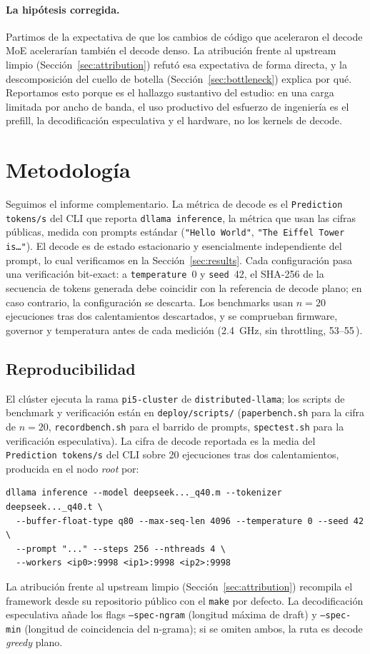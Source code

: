 \documentclass[10pt,a4paper]{article}
\begin{document}
\paragraph{La hipótesis corregida.} Partimos de la expectativa de que los cambios de código que aceleraron el decode MoE acelerarían también el decode denso. La atribución frente al upstream limpio (Sección~\ref{sec:attribution}) refutó esa expectativa de forma directa, y la descomposición del cuello de botella (Sección~\ref{sec:bottleneck}) explica por qué. Reportamos esto porque es el hallazgo sustantivo del estudio: en una carga limitada por ancho de banda, el uso productivo del esfuerzo de ingeniería es el prefill, la decodificación especulativa y el hardware, no los kernels de decode.

\section{Metodología}
Seguimos el informe complementario. La métrica de decode es el \texttt{Prediction tokens/s} del CLI que reporta \texttt{dllama inference}, la métrica que usan las cifras públicas, medida con prompts estándar (\texttt{"Hello World"}, \texttt{"The Eiffel Tower is\ldots"}). El decode es de estado estacionario y esencialmente independiente del prompt, lo cual verificamos en la Sección~\ref{sec:results}. Cada configuración pasa una verificación bit-exact: a \texttt{temperature}~0 y \texttt{seed}~42, el SHA-256 de la secuencia de tokens generada debe coincidir con la referencia de decode plano; en caso contrario, la configuración se descarta. Los benchmarks usan $n{=}20$ ejecuciones tras dos calentamientos descartados, y se comprueban firmware, governor y temperatura antes de cada medición (2.4~GHz, sin throttling, 53--55\,\textcelsius).

\subsection{Reproducibilidad}
El clúster ejecuta la rama \texttt{pi5-cluster} de \texttt{distributed-llama}; los scripts de benchmark y verificación están en \texttt{deploy/scripts/} (\texttt{paperbench.sh} para la cifra de $n{=}20$, \texttt{recordbench.sh} para el barrido de prompts, \texttt{spectest.sh} para la verificación especulativa). La cifra de decode reportada es la media del \texttt{Prediction tokens/s} del CLI sobre 20 ejecuciones tras dos calentamientos, producida en el nodo \emph{root} por:
\begin{lstlisting}
dllama inference --model deepseek..._q40.m --tokenizer deepseek..._q40.t \
  --buffer-float-type q80 --max-seq-len 4096 --temperature 0 --seed 42 \
  --prompt "..." --steps 256 --nthreads 4 \
  --workers <ip0>:9998 <ip1>:9998 <ip2>:9998
\end{lstlisting}
La atribución frente al upstream limpio (Sección~\ref{sec:attribution}) recompila el framework desde su repositorio público con el \texttt{make} por defecto. La decodificación especulativa añade los flags \texttt{--spec-ngram} (longitud máxima de draft) y \texttt{--spec-min} (longitud de coincidencia del n-grama); si se omiten ambos, la ruta es decode \emph{greedy} plano.
\end{document}
